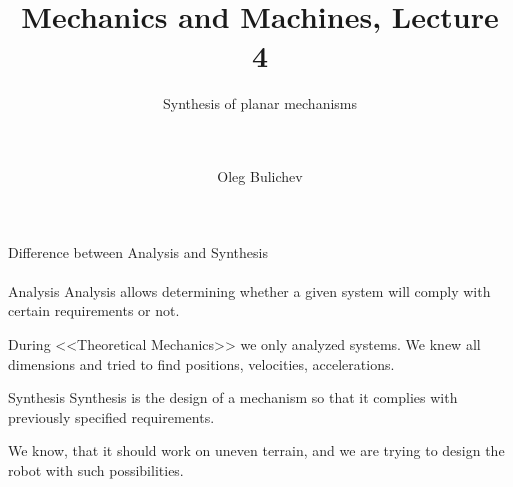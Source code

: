 \documentclass[aspectratio=169]{beamer}
\title[MaM]{Mechanics and Machines, Lecture 4} %
\subtitle{Synthesis of planar mechanisms
\\ \        \\ \   
         } %
\author{Oleg Bulichev}
\newcommand{\fbckg}[1]{\usebackgroundtemplate{\texttt{[image: \#1]}}}%
\begin{document}
\setlength{\abovedisplayskip}{0pt}
\setlength{\belowdisplayskip}{0pt}
\setlength{\abovedisplayshortskip}{0pt}
\setlength{\belowdisplayshortskip}{0pt}

\fbckg{fibeamer/figs/title_page.png}

\fbckg{fibeamer/figs/common.png}

\note{\scriptsize \begin{itemize}
        \item \
    \end{itemize}}

\begin{frame}[c]{Difference between Analysis and Synthesis}
    \framesubtitle{}
    \vspace{-0.6cm}
    \begin{block}{Analysis}
        Analysis allows determining whether a given system will comply with certain requirements or not.

        During <<Theoretical Mechanics>> we only analyzed systems. We knew all dimensions and tried to find positions, velocities, accelerations.
    \end{block}

    \begin{block}{Synthesis}
        Synthesis is the design of a mechanism so that it complies with previously specified requirements.

        We know, that it should work on uneven terrain, and we are trying to design the robot with such possibilities. 
    \end{block}
\end{frame}
\end{document}
